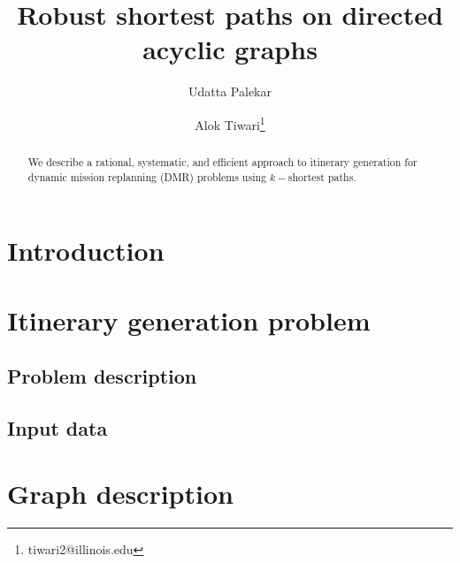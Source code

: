 \documentclass[8pt]{article}
\begin{document}
\title{Robust shortest paths on directed acyclic graphs}

\author[1]{Udatta Palekar}
\author[3]{Alok Tiwari\thanks{tiwari2@illinois.edu}}


\renewcommand\Authands{, and }


\maketitle
\begin{abstract}
We describe a rational, systematic, and efficient approach to itinerary generation for dynamic mission replanning (DMR) problems using $k-$shortest paths. 
\end{abstract}

\section{Introduction}\label{sec:intro}

%
\section{Itinerary generation problem}\label{sec:problem}
\subsection{Problem description}\label{subsec:desc}

\subsection{Input data}\label{subsec:data}

\section{Graph description}\label{sec:graph}
\end{document}
